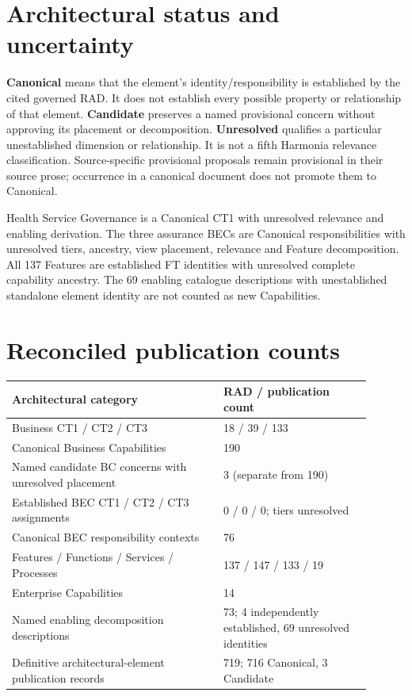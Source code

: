 \section{Architectural status and uncertainty}

\textbf{Canonical} means that the element's identity/responsibility is established
by the cited governed RAD. It does not establish every possible property or
relationship of that element. \textbf{Candidate} preserves a named provisional
concern without approving its placement or decomposition. \textbf{Unresolved}
qualifies a particular unestablished dimension or relationship. It is not a fifth
Harmonia relevance classification. Source-specific provisional proposals remain
provisional in their source prose; occurrence in a canonical document does not
promote them to Canonical.

Health Service Governance is a Canonical CT1 with unresolved relevance and enabling
derivation. The three assurance BECs are Canonical responsibilities with unresolved
tiers, ancestry, view placement, relevance and Feature decomposition. All 137
Features are established FT identities with unresolved complete capability ancestry.
The 69 enabling catalogue descriptions with unestablished standalone element
identity are not counted as new Capabilities.

\section{Reconciled publication counts}

\begin{longtable}{|p{0.53\linewidth}|p{0.37\linewidth}|}
\hline\rowcolor{TableHead}\textbf{Architectural category} & \textbf{RAD / publication count}\\\hline
Business CT1 / CT2 / CT3 & 18 / 39 / 133\\\hline
Canonical Business Capabilities & 190\\\hline
Named candidate BC concerns with unresolved placement & 3 (separate from 190)\\\hline
Established BEC CT1 / CT2 / CT3 assignments & 0 / 0 / 0; tiers unresolved\\\hline
Canonical BEC responsibility contexts & 76\\\hline
Features / Functions / Services / Processes & 137 / 147 / 133 / 19\\\hline
Enterprise Capabilities & 14\\\hline
Named enabling decomposition descriptions & 73; 4 independently established, 69 unresolved identities\\\hline
Definitive architectural-element publication records & 719; 716 Canonical, 3 Candidate\\\hline
\end{longtable}

